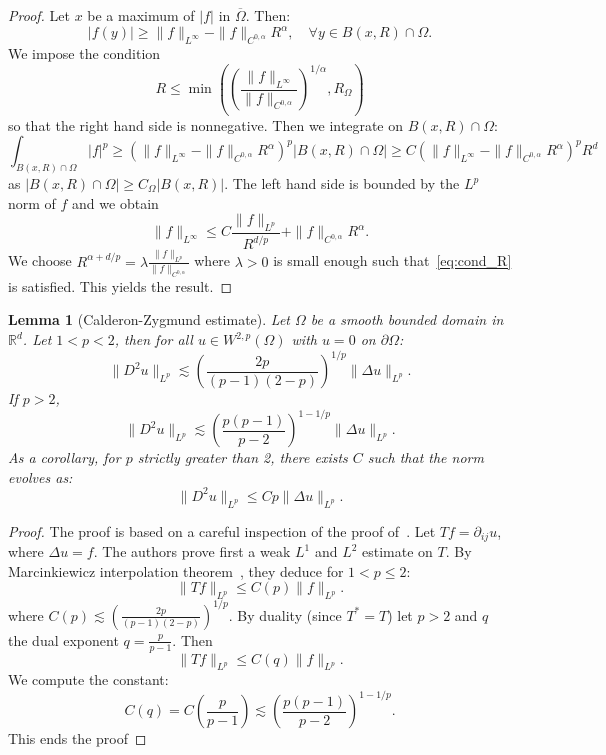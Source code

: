 \documentclass[a4paper,twosided, 11pt]{article}
\renewcommand{\color}[2][]{}
\newcommand{\R}{\mathbb{R}}
\newcommand {\f}   {\frac}
\newcommand {\p}   {\partial}
\theoremstyle{plain}
\newtheorem{lemma}[thm]{Lemma}
\theoremstyle{remark}
\numberwithin{equation}{section}
\begin{document}
{\color{blue}
\begin{proof}
Let $x$ be a maximum of $|f|$ in $\overline{\Omega}$. Then:
$$
|f(y)|\ge \|f\|_{L^{\infty}}-\|f\|_{C^{0,\alpha}}R^{\alpha}, \quad \forall y\in B(x,R)\cap\Omega.
$$
We impose the condition 
\begin{equation}\label{eq:cond_R}
R\le \min\left(\left(\frac{\|f\|_{L^{\infty}}}{\|f\|_{C^{0,\alpha}}}\right)^{1/\alpha},R_{\Omega}\right) 
\end{equation}
so that the right hand side is nonnegative.
Then we integrate on $B(x,R)\cap\Omega$:
$$
\int_{B(x,R)\cap\Omega}|f|^{p}\ge  (\|f\|_{L^{\infty}}-\|f\|_{C^{0,\alpha}}R^{\alpha})^{p} |B(x,R)\cap\Omega|\ge C (\|f\|_{L^{\infty}}-\|f\|_{C^{0,\alpha}}R^{\alpha})^{p} R^d
$$
as $|B(x,R)\cap \Omega|\ge C_{\Omega}|B(x,R)|$.
The left hand side is bounded by the $L^p$ norm of $f$ and we obtain 
$$
\|f\|_{L^{\infty}}\le C\f{\|f\|_{L^{p}}}{R^{d/p}}+ \|f\|_{C^{0,\alpha}}R^{\alpha}.
$$
We choose $R^{\alpha+d/p}=\lambda\f{\|f\|_{L^{p}}}{\|f\|_{C^{0,\alpha}}}$  where $\lambda> 0$ is small enough such that~\eqref{eq:cond_R} is satisfied. This yields the result.
\end{proof}}



\begin{lemma}[Calderon-Zygmund estimate]\label{lem:Calderon_Zygmund} Let $\Omega$ be a smooth bounded domain in $\R^d$. 
Let $1< p< 2$, then for all $u\in W^{2,p}(\Omega)$ {\color{blue}with $u=0$ on $\partial\Omega$:}
$$
\|D^{2} u\|_{L^{p}}\lesssim \left(\f{2p}{(p-1)(2-p)}\right)^{1/p} \|\Delta u \|_{L^{p}}.
$$
If $p> 2$, 
$$
\|D^{2} u\|_{L^{p}}\lesssim \left(\f{p(p-1)}{p-2}\right)^{1-1/p}\|\Delta u \|_{L^{p}}.
$$
As a corollary, for $p$ strictly greater than 2, there exists $C$ such that the norm evolves as:
$$
\|D^{2} u\|_{L^{p}}\le Cp\|\Delta u \|_{L^{p}}.
$$
\end{lemma}


\begin{proof}
The proof is based on a careful inspection of the proof of~\cite[Theorem 9.9]{gilbarg2001elliptic}. Let $Tf=\p_{ij}u$, where $\Delta u =f$. The authors prove first a weak $L^1$ and $L^2$ estimate on $T$. By Marcinkiewicz interpolation theorem~\cite[Theorem 9.8]{gilbarg2001elliptic}, they deduce for $1<p\le 2$:
$$
\|Tf\|_{L^{p}}\le C(p)\|f\|_{L^{p}}.
$$
where $C(p)\lesssim  \left(\f{2p}{(p-1)(2-p)}\right)^{1/p}$. By duality (since $T^{*}= T$) let $p>2$ and $q$ the dual exponent $q=\f{p}{p-1}$. Then 
$$
\|Tf\|_{L^{p}}\le C(q)\|f\|_{L^{p}}.
$$
We compute the constant:
$$
C(q) = C\left(\f{p}{p-1}\right) \lesssim\left(\f{p(p-1)}{p-2}\right)^{1-1/p}.
$$
This ends the proof
\end{proof}
\end{document}

